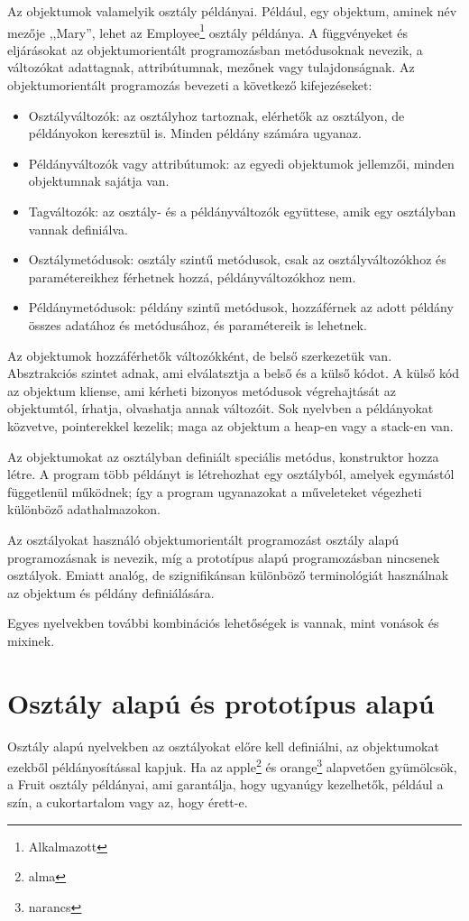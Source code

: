 \documentclass[]{thesis-ekf}
\theoremstyle{definition}
\begin{document}
	Az objektumok valamelyik osztály példányai. Például, egy objektum, aminek név mezője ,,Mary'', lehet az Employee\footnote{Alkalmazott} osztály példánya. A függvényeket és eljárásokat az objektumorientált programozásban metódusoknak nevezik, a változókat adattagnak, attribútumnak, mezőnek vagy tulajdonságnak. Az objektumorientált programozás bevezeti a következő kifejezéseket:
	
	\begin{itemize}
		\item Osztályváltozók: az osztályhoz tartoznak, elérhetők az osztályon, de példányokon keresztül is. Minden példány számára ugyanaz.
		\item Példányváltozók vagy attribútumok: az egyedi objektumok jellemzői, minden objektumnak sajátja van.
		\item Tagváltozók: az osztály- és a példányváltozók együttese, amik egy osztályban vannak definiálva.
		\item Osztálymetódusok: osztály szintű metódusok, csak az osztályváltozókhoz és paramétereikhez férhetnek hozzá, példányváltozókhoz nem.
		\item Példánymetódusok: példány szintű metódusok, hozzáférnek az adott példány összes adatához és metódusához, és paramétereik is lehetnek.
	\end{itemize}
	
	Az objektumok hozzáférhetők változókként, de belső szerkezetük van. Absztrakciós szintet adnak, ami elválatsztja a belső és a külső kódot. A külső kód az objektum kliense, ami kérheti bizonyos metódusok végrehajtását az objektumtól, írhatja, olvashatja annak változóit. Sok nyelvben a példányokat közvetve, pointerekkel kezelik; maga az objektum a heap-en vagy a stack-en van.
	
	Az objektumokat az osztályban definiált speciális metódus, konstruktor hozza létre. A program több példányt is létrehozhat egy osztályból, amelyek egymástól függetlenül működnek; így a program ugyanazokat a műveleteket végezheti különböző adathalmazokon.
	
	Az osztályokat használó objektumorientált programozást osztály alapú programozásnak is nevezik, míg a prototípus alapú programozásban nincsenek osztályok. Emiatt analóg, de szignifikánsan különböző terminológiát használnak az objektum és példány definiálására.
	
	Egyes nyelvekben további kombinációs lehetőségek is vannak, mint vonások és mixinek.
	
	\section{Osztály alapú és prototípus alapú}
	Osztály alapú nyelvekben az osztályokat előre kell definiálni, az objektumokat ezekből példányosítással kapjuk. Ha az apple\footnote{alma} és orange\footnote{narancs} alapvetően gyümölcsök, a Fruit osztály példányai, ami garantálja, hogy ugyanúgy kezelhetők, például a szín, a cukortartalom vagy az, hogy érett-e.
	
\end{document}
